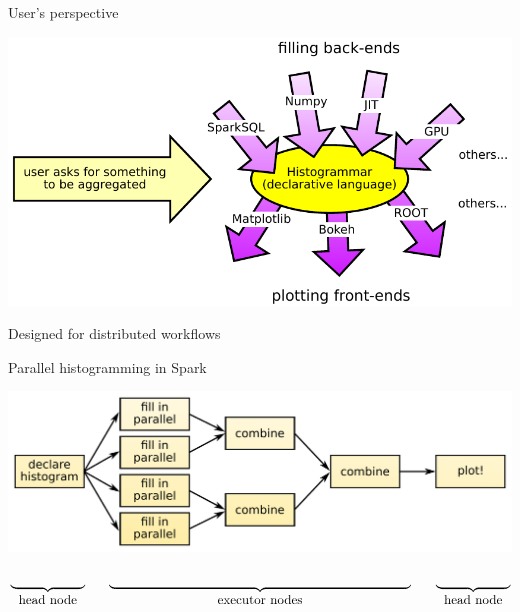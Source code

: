 \documentclass[aspectratio=169]{beamer}
\begin{document}
\begin{frame}{User's perspective}
\vspace{0.5 cm}
\begin{center}
\includegraphics[width=0.9\linewidth]{front-back-ends.pdf}
\end{center}
\end{frame}

\begin{frame}{Designed for distributed workflows}
\vspace{0.5 cm}
\begin{block}{Parallel histogramming in Spark}
\end{block}

\includegraphics[width=\linewidth]{parallelization.pdf}

\vspace{-1 cm}
\[ \underbrace{\mbox{\hspace{2 cm}}}_{\mbox{head node}} \hspace{0.6 cm} \underbrace{\mbox{\hspace{8.125 cm}}}_{\mbox{executor nodes}} \hspace{0.625 cm} \underbrace{\mbox{\hspace{2 cm}}}_{\mbox{head node}} \]

\end{frame}
\end{document}
